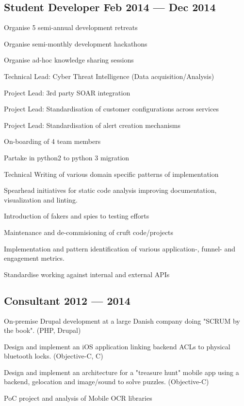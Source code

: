 \subsection{{Student Developer \hfill Feb 2014 --- Dec 2014}}
\begin{zitemize}
	\item Organise 5 semi-annual development retreats
	\item Organise semi-monthly development hackathons
	\item Organise ad-hoc knowledge sharing sessions
	\item Technical Lead: Cyber Threat Intelligence (Data acquisition/Analysis)
	\item Project Lead: 3rd party SOAR integration
	\item Project Lead: Standardisation of customer configurations across services
	\item Project Lead: Standardisation of alert creation mechanisms
	\item On-boarding of 4 team members
	\item Partake in python2 to python 3 migration
	\item Technical Writing of various domain specific patterns of implementation
	\item Spearhead initiatives for static code analysis improving documentation, visualization and linting.
	\item Introduction of fakers and spies to testing efforts
	\item Maintenance and de-commisioning of cruft code/projects
	\item Implementation and pattern identification of various application-, funnel- and engagement metrics.
	\item Standardise working against internal and external APIs
\end{zitemize}

\subsection{{Consultant \hfill 2012 --- 2014}}
\begin{zitemize}
	\item On-premise Drupal development at a large Danish company doing "SCRUM by the book". (PHP, Drupal)
	\item Design and implement an iOS application linking backend ACLs to physical bluetooth locks. (Objective-C, C)
	\item Design and implement an architecture for a "treasure hunt" mobile app using a backend, gelocation and image/sound to solve
puzzles. (Objective-C)
	\item PoC project and analysis of Mobile OCR libraries
\end{zitemize}


